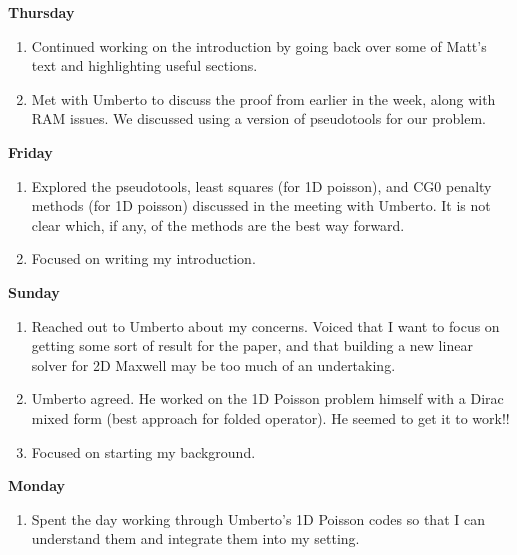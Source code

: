 \documentclass[12pt,a4paper]{article}
\begin{document}
\textbf{Thursday}
\begin{enumerate}
   \item Continued working on the introduction by going back over some of Matt's text and highlighting useful sections.
    \item Met with Umberto to discuss the proof from earlier in the week, along with RAM issues. We discussed using a version of pseudotools for our problem.
\end{enumerate}


\textbf{Friday}
\begin{enumerate}
   \item Explored the pseudotools, least squares (for 1D poisson), and CG0 penalty methods (for 1D poisson) discussed in the meeting with Umberto. It is not clear which, if any, of the methods are the best way forward. 
   \item Focused on writing my introduction.
\end{enumerate}


\textbf{Sunday}
\begin{enumerate}
   \item Reached out to Umberto about my concerns. Voiced that I want to focus on getting some sort of result for the paper, and that building a new linear solver for 2D Maxwell may be too much of an undertaking.
   \item Umberto agreed. He worked on the 1D Poisson problem himself with a Dirac mixed form (best approach for folded operator). He seemed to get it to work!!
   \item Focused on starting my background.
\end{enumerate}


\textbf{Monday}
\begin{enumerate}
   \item Spent the day working through Umberto's 1D Poisson codes so that I can understand them and integrate them into my setting.
\end{enumerate}
\end{document}
